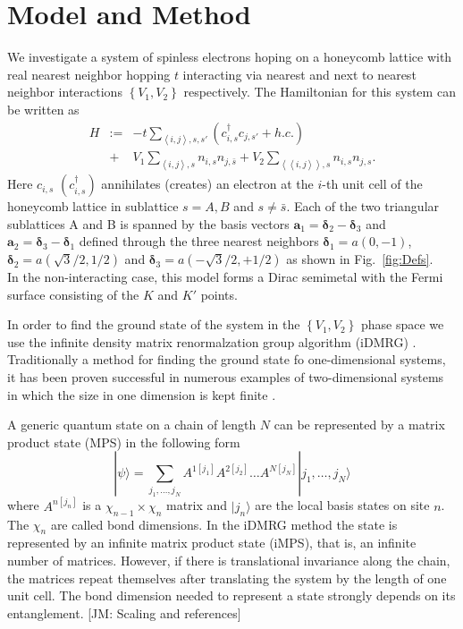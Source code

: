\documentclass[aps,prx,10pt,twocolumn,floatfix,superscriptaddress,showpacs,numerical,footinbib]{revtex4-1}
\newcommand{\ket}[1]{| #1 \rangle}
\newcommand{\noteJM}[1]{{\color{red} [JM: #1]}}
\newcommand{\bs}[1]{{\boldsymbol{#1}}}
\begin{document}
\section{\label{sec:modandmeth}Model and Method}
%
We investigate a system of spinless electrons hoping on a honeycomb lattice with real nearest neighbor hopping $t$ interacting via nearest and next to nearest neighbor interactions 
$\left\lbrace V_{1},V_{2}\right\rbrace$ respectively. 
%
The Hamiltonian for this system can be written as
\begin{eqnarray}
\nonumber
%
H&:=&-t\sum_{\left\langle i,j\right\rangle ,s,s'}(c^{\dagger}_{i,s}c_{j,s'}+h.c.)\\
%
\;&+&
V_{1}\sum_{\left\langle i,j\right\rangle ,s }n_{i,s}n_{j,\bar{s}}+
%
V_{2}\sum_{\left\langle \left\langle i,j\right\rangle \right\rangle ,s }n_{i,s}n_{j,s}.
%
\label{eq:H}
%
\end{eqnarray}
%
Here $c_{i,s}$ $(c^{\dagger}_{i,s})$  annihilates (creates) an electron at the $i$-th unit cell of the honeycomb lattice
in sublattice $s=A,B$ and $s\neq\bar{s}$. 
%
Each of the two triangular sublattices A and B is spanned by the basis vectors
$\bs{a}_{1}=\bs{\delta}_{2}-\bs{\delta}_{3}$ and 
$\bs{a}_{2}=\bs{\delta}_{3}-\bs{\delta}_{1}$ defined through the three nearest neighbors $\bs{\delta}_{1}=a(0,-1)$,  
$\bs{\delta}_{2}=a(\sqrt{3}/2,1/2)$ and $\bs{\delta}_{3}=a(-\sqrt{3}/2,+1/2)$ as shown in Fig.~\ref{fig:Defs}.\\
%
In the non-interacting case, this model forms a Dirac semimetal with the Fermi surface consisting of the $K$ and $K'$ points.

In order to find the ground state of the system in the $\left\lbrace V_{1},V_{2}\right\rbrace$ phase space
we use the infinite density matrix renormalzation group algorithm (iDMRG) \cite{M08,W92,KZM13}. Traditionally a method for finding the ground state fo one-dimensional systems, it has been proven successful in numerous examples of two-dimensional systems in which the size in one dimension is kept finite \cite{papers}. 

A generic quantum state on a chain of length $N$ can be represented by a matrix product state (MPS) in the following form
\begin{equation}
 \ket{\psi} = \sum_{j_1, \ldots, j_N} A^{1 \left[j_1\right]} A^{2 \left[j_2\right]} \ldots A^{N \left[j_N\right]} \ket{j_1, \ldots, j_N}
\end{equation}
where $A^{n \left[j_n\right]}$ is a $\chi_{n-1} \times \chi_n$ matrix and $\ket{j_n}$ are the local basis states on site $n$. The $\chi_n$ are called bond dimensions. In the iDMRG method the state is represented by an infinite matrix product state (iMPS), that is, an infinite number of matrices. However, if there is translational invariance along the chain, the matrices repeat themselves after translating the system by the length of one unit cell. The bond dimension needed to represent a state strongly depends on its entanglement. \noteJM{Scaling and references}
\end{document}
